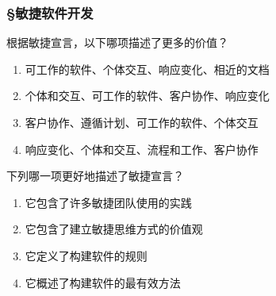 \subsubsection*{\S 敏捷软件开发}
\setcounter{problemname}{0}

\begin{problem}
	根据敏捷宣言，以下哪项描述了更多的价值？
        \begin{enumerate}[label=\Alph*.]
            \item 可工作的软件、个体交互、响应变化、相近的文档
            \item 个体和交互、可工作的软件、客户协作、响应变化
            \item 客户协作、遵循计划、可工作的软件、个体交互
            \item 响应变化、个体和交互、流程和工作、客户协作
        \end{enumerate}
\end{problem}



\begin{problem}
	下列哪一项更好地描述了敏捷宣言？
    \vspace{-0.8em}
    \begin{multicols}{2}
        \begin{enumerate}[label=\Alph*.]
            \item 它包含了许多敏捷团队使用的实践
            \item 它包含了建立敏捷思维方式的价值观
            \item 它定义了构建软件的规则
            \item 它概述了构建软件的最有效方法
        \end{enumerate}
    \end{multicols}
    \vspace{-1em}
\end{problem}




